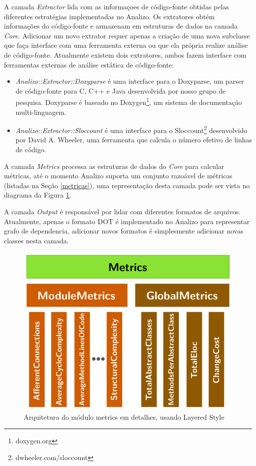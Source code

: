 A camada {\it Extractor} lida com as informaçoes de código-fonte obtidas pelas
diferentes estratégias implementadas no Analizo. Os extratores obtém
informações do código-fonte e armazenam em estruturas de dados na camada {\it
Core}. Adicionar um novo extrator requer apenas a criação de uma nova subclasse
que faça interface com uma ferramenta externa ou que ela própria realize análise
de código-fonte. Atualmente existem dois extratores, ambos fazem interface
com ferramentas externas de análise estática de código-fonte:

\begin{itemize}

  \item {\it Analizo::Extractor::Doxyparse} é uma interface para o Doxyparse,
  um parser de código-fonte para C, C++ e Java desenvolvida por nosso grupo de
  pesquisa\cite{Costa2009}. Doxyparse é baseado no
  Doxygen\footnote{doxygen.org}, um sistema de documentação multi-linguagem.

  \item {\it Analizo::Extractor::Sloccount} é uma interface para o
  Sloccount\footnote{dwheeler.com/sloccount} desenvolvido por David A. Wheeler,
  uma ferramenta que calcula o número efetivo de linhas de código.

\end{itemize}

A camada {\it Metrics} processa as estruturas de dados do {\it Core} para
calcular métricas, até o momento Analizo suporta um conjunto razoável de
métricas (listadas na Seção \ref{metricas}), uma representação desta camada
pode ser vista no diagrama da Figura \ref{arquitetura-metrics-analizo}.

A camada {\it Output} é responsável por lidar com diferentes formatos de
arquivos.  Atualmente, apenas o formato DOT é implementado no Analizo para
representar grafo de dependencia, adicionar novos formatos é simplesmente
adicionar novas classes nesta camada.

\begin{figure}[H]
\center
\includegraphics[scale=0.4]{imagens/analizo-metrics-architecture.png}
\caption{Arquitetura do módulo metrics em detalhes, usando Layered Style \cite{Clements2002}}
\label{arquitetura-metrics-analizo}
\end{figure}

